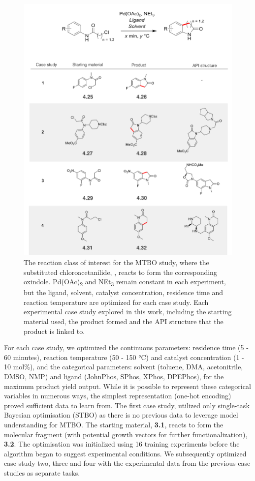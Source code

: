 \begin{figure}
    \centering
    \includegraphics[width=\textwidth]{gfx/Chapter04/ch_activation_case_studies.png}
    \caption{ The reaction class of interest for the MTBO study, where the substituted chloroacetanilide, , reacts to form the corresponding oxindole. Pd(OAc)\textsubscript{2} and NEt\textsubscript{3} remain constant in each experiment, but the ligand, solvent, catalyst concentration, residence time and reaction temperature are optimized for each case study. Each experimental case study explored in this work, including the starting material used, the product formed and the API structure that the product is linked to.}
    \label{fig:ch_activation}
\end{figure}

For each case study, we optimized the continuous parameters: residence time (5 - 60 minutes), reaction temperature (50 - 150 °C) and catalyst concentration (1 - 10 mol\%), and the categorical parameters: solvent (toluene, DMA, acetonitrile, DMSO, NMP) and ligand (JohnPhos, SPhos, XPhos, DPEPhos), for the maximum product yield output. While it is possible to represent these categorical variables in numerous ways, the simplest representation (one-hot encoding) proved sufficient data to learn from. The first case study, utilized only single-task Bayesian optimisation (STBO) as there is no previous data to leverage model understanding for MTBO. The starting material, \textbf{3.1}, reacts to form the molecular fragment (with potential growth vectors for further functionalization), \textbf{3.2}. The optimisation was initialized using 16 training experiments before the algorithm began to suggest experimental conditions. We subsequently optimized case study two, three and four with the experimental data from the previous case studies as separate tasks.


